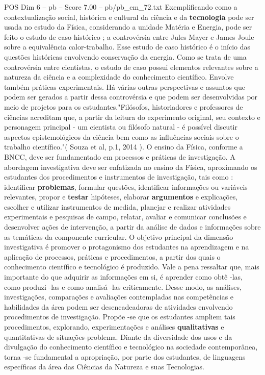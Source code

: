 \begin{textsample}{POS Dim 6 – pb – Score 7.00 – pb/pb\_em\_72.txt}
Exemplificando como a contextualização social, histórica e cultural da ciência e da \textbf{tecnologia} pode ser usada no estudo da Física, considerando a unidade Matéria e Energia, pode ser feito o estudo de caso histórico ; a controvérsia entre Jules Mayer e James Joule sobre a equivalência calor-trabalho.
Esse estudo de caso histórico é o início das questões históricas envolvendo conservação da energia.
Como se trata de uma controvérsia entre cientistas, o estudo de caso possui elementos relevantes sobre a natureza da ciência e a complexidade do conhecimento científico.
Envolve também práticas experimentais.
Há várias outras perspectivas e assuntos que podem ser gerados a partir dessa controvérsia e que podem ser desenvolvidas por meio de projetos para os estudantes."Filósofos, historiadores e professores de ciências acreditam que, a partir da leitura do experimento original, seu contexto e personagem principal - um cientista ou filósofo natural - é possível discutir aspectos epistemológicos da ciência bem como as influências sociais sobre o trabalho científico."( Souza et al, p.1, 2014 ).
O ensino da Física, conforme a BNCC, deve ser fundamentado em processos e práticas de investigação.
A abordagem investigativa deve ser enfatizada no ensino da Física, aproximando os estudantes dos procedimentos e instrumentos de investigação, tais como : identificar \textbf{problemas}, formular questões, identificar informações ou variáveis relevantes, propor e \textbf{testar} hipóteses, elaborar \textbf{argumentos} e explicações, escolher e utilizar instrumentos de medida, planejar e realizar atividades experimentais e pesquisas de campo, relatar, avaliar e comunicar conclusões e desenvolver ações de intervenção, a partir da análise de dados e informações sobre as temáticas da componente curricular.
O objetivo principal da dimensão investigativa é promover o protagonismo dos estudantes na aprendizagem e na aplicação de processos, práticas e procedimentos, a partir dos quais o conhecimento científico e tecnológico é produzido.
Vale a pena ressaltar que, mais importante do que adquirir as informações em si, é aprender como obtê -las, como produzi -las e como analisá -las criticamente.
Desse modo, as análises, investigações, comparações e avaliações contempladas nas competências e habilidades da área podem ser desencadeadoras de atividades envolvendo procedimentos de investigação.
Propõe -se que os estudantes ampliem tais procedimentos, explorando, experimentações e análises \textbf{qualitativas} e quantitativas de situações-problema.
Diante da diversidade dos usos e da divulgação do conhecimento científico e tecnológico na sociedade contemporânea, torna -se fundamental a apropriação, por parte dos estudantes, de linguagens específicas da área das Ciências da Natureza e suas Tecnologias.

\end{textsample}
